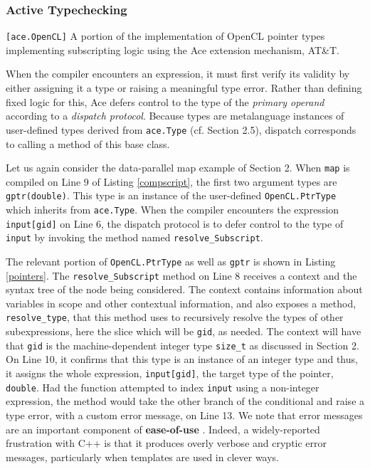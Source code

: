 \documentclass[9pt,preprint]{sigplanconf}
\begin{document}
\subsubsection{Active Typechecking}
\begin{codelisting}

\caption{\texttt{[ace.OpenCL]} A portion of the implementation of OpenCL pointer types implementing subscripting logic using the Ace extension mechanism, AT\&T.}
\label{pointers}
\end{codelisting}
When the compiler encounters an expression, it must first verify its validity by either assigning it a type or raising a meaningful type error. Rather than defining fixed logic for this, Ace defers control to the {type} of the \emph{primary operand} according to a {\em dispatch protocol}. Because types are metalanguage instances of user-defined types derived from \verb|ace.Type| (cf. Section 2.5), dispatch corresponds to calling a method of this base class.

Let us again consider the data-parallel map example of Section 2. When \verb|map| is compiled on Line 9 of Listing \ref{compscript}, the first two argument types are \verb|gptr(double)|. This type is an instance of the user-defined \verb|OpenCL.PtrType| which inherits from \verb|ace.Type|. When the compiler encounters the expression \verb|input[gid]| on Line 6, the dispatch protocol is to defer control to the type of \verb|input| by invoking the method named \verb|resolve_Subscript|.

The relevant portion of \verb|OpenCL.PtrType| as well as \verb|gptr| is shown in Listing \ref{pointers}. The \verb|resolve_Subscript| method on Line 8 receives a context and the syntax tree of the node being considered. The context contains information about variables in scope and other contextual information, and also exposes a method, \verb|resolve_type|, that this method uses to recursively resolve the types of other subexpressions, here the slice which will be \verb|gid|, as needed. The context will have that \verb|gid| is the machine-dependent integer type \verb|size_t| as discussed in Section 2. On Line 10, it confirms that this type is an instance of an integer type and thus, it assigns the whole expression, \verb|input[gid]|, the target type of the pointer, \verb|double|. Had the function attempted to index \verb|input| using a non-integer expression, the method would take the other branch of the conditional and raise a type error, with a custom error message, on Line 13. We note that error messages are an important component of \textbf{ease-of-use} \cite{marceau2011measuring}. Indeed, a widely-reported frustration with C++ is that it produces overly verbose and cryptic error messages, particularly when templates are used in clever ways.
\end{document}
